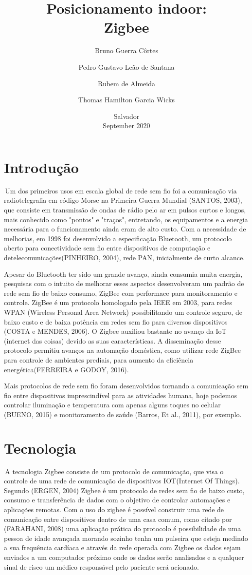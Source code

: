 \documentclass{article}
\title{Posicionamento indoor:\\Zigbee}
\author{Bruno Guerra Côrtes\and
Pedro Gustavo Leão de Santana\and
Rubem de Almeida\and
Thomas Hamilton Garcia Wicks}
\date{Salvador\\September 2020}
\begin{document}
\begin{titlepage}
\maketitle
\end{titlepage}

\section{Introdução}
\quad \,Um dos primeiros usos em escala global de rede sem fio foi a comunicação via radiotelegrafia em código Morse na Primeira Guerra Mundial (SANTOS, 2003), que consiste em transmissão de ondas de rádio pelo ar em pulsos curtos e longos, mais conhecido como "pontos" e "traços", entretando, os equipamentos e a energia necessária para o funcionamento ainda eram de alto custo. Com a necessidade de melhorias, em 1998 foi desenvolvido a especificação Bluetooth, um protocolo aberto para conectividade sem fio entre dispositivos de computação e detelecomunicações(PINHEIRO, 2004), rede PAN, inicialmente de curto alcance. 

Apesar do Bluetooth ter sido um grande avanço, ainda consumia muita energia, pesquisas com o intuito de melhorar esses aspectos desenvolveram um padrão de rede sem fio de baixo consumo, ZigBee com performace para monitoramento e controle. ZigBee é um protocolo homologado pela IEEE em 2003, para redes WPAN (Wireless Personal Area Network) possibilitando um controle seguro, de baixo custo e de baixa potência em redes sem fio para diversos dispositivos (COSTA e MENDES, 2006). O Zigbee auxiliou bastante no avanço da IoT (internet das coisas) devido as suas características. A disseminação desse protocolo permitiu avanços na automação doméstica, como utilizar rede ZigBee para controle de ambientes prediais, para aumento da eficiência energética(FERREIRA e GODOY, 2016). 

Mais protocolos de rede sem fio foram desenvolvidos tornando a comunicação sem fio entre dispositivos imprescindível para as atividades humana, hoje podemos controlar iluminação e temperatura com apenas alguns toques no celular (BUENO, 2015) e monitoramento de saúde (Barros, Et al., 2011), por exemplo.
\section{Tecnologia}
\quad \,A tecnologia Zigbee consiste de um protocolo de comunicação, que visa o controle de uma rede de comunicação de dispositivos IOT(Internet Of Things). Segundo (ERGEN, 2004)  Zigbee é um protocolo de redes sem fio de baixo custo, consumo e transferência de dados com o objetivo de controlar automações e aplicações remotas. Com o uso do zigbee é possível construir uma rede de comunicação entre dispositivos dentro de uma casa comum, como citado por (FARAHANI, 2008) uma aplicação prática do protocolo é possibilidade de uma pessoa de idade avançada morando sozinho tenha um pulseira que esteja medindo a sua frequência cardíaca e através da rede operada com Zigbee os dados sejam enviados a um computador próximo onde os dados serão analisados e a qualquer sinal de risco um médico responsável pelo paciente será acionado.
\end{document}
